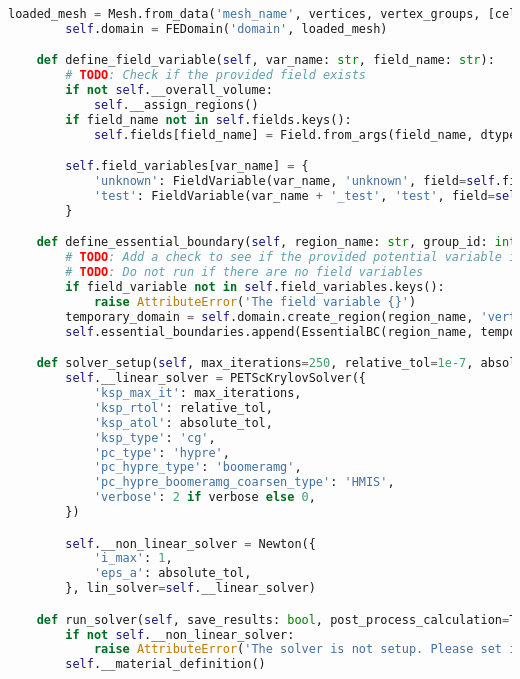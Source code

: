 \begin{lstlisting}[language=Python,caption={Class interfacing to SfePy and contains routines for the PHM and spherical model \gls{FEM} solution.},captionpos=b,label=lst:fem_solver_class]
        loaded_mesh = Mesh.from_data('mesh_name', vertices, vertex_groups, [cells], [cell_groups], [connectivity])
        self.domain = FEDomain('domain', loaded_mesh)

    def define_field_variable(self, var_name: str, field_name: str):
        # TODO: Check if the provided field exists
        if not self.__overall_volume:
            self.__assign_regions()
        if field_name not in self.fields.keys():
            self.fields[field_name] = Field.from_args(field_name, dtype=np.float64, shape=(1, ), region=self.__overall_volume, approx_order=1)

        self.field_variables[var_name] = {
            'unknown': FieldVariable(var_name, 'unknown', field=self.fields[field_name]),
            'test': FieldVariable(var_name + '_test', 'test', field=self.fields[field_name], primary_var_name=var_name),
        }

    def define_essential_boundary(self, region_name: str, group_id: int, field_variable: str, field_value: float):
        # TODO: Add a check to see if the provided potential variable is a defined potential
        # TODO: Do not run if there are no field variables
        if field_variable not in self.field_variables.keys():
            raise AttributeError('The field variable {}')
        temporary_domain = self.domain.create_region(region_name, 'vertices of group ' + str(group_id), 'facet', add_to_regions=False)
        self.essential_boundaries.append(EssentialBC(region_name, temporary_domain, {field_variable + '.all' : field_value}))

    def solver_setup(self, max_iterations=250, relative_tol=1e-7, absolute_tol=1e-3, verbose=False):
        self.__linear_solver = PETScKrylovSolver({
            'ksp_max_it': max_iterations,
            'ksp_rtol': relative_tol,
            'ksp_atol': absolute_tol,
            'ksp_type': 'cg',
            'pc_type': 'hypre',
            'pc_hypre_type': 'boomeramg',
            'pc_hypre_boomeramg_coarsen_type': 'HMIS',
            'verbose': 2 if verbose else 0,
        })

        self.__non_linear_solver = Newton({
            'i_max': 1,
            'eps_a': absolute_tol,
        }, lin_solver=self.__linear_solver)

    def run_solver(self, save_results: bool, post_process_calculation=True):
        if not self.__non_linear_solver:
            raise AttributeError('The solver is not setup. Please set it up before calling run.')
        self.__material_definition()


\end{lstlisting}
